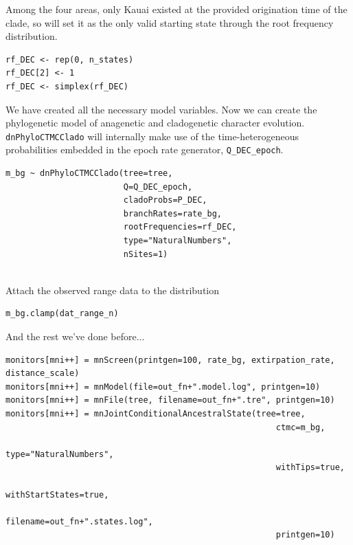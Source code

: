 Among the four areas, only Kauai existed at the provided origination time of the clade, so will set it as the only valid starting state through the root frequency distribution.

\begin{snugshade}
\begin{lstlisting}
rf_DEC <- rep(0, n_states)
rf_DEC[2] <- 1 
rf_DEC <- simplex(rf_DEC)
\end{lstlisting}
\end{snugshade}

We have created all the necessary model variables.
Now we can create the phylogenetic model of anagenetic and cladogenetic character evolution.
{\tt dnPhyloCTMCClado} will internally make use of the time-heterogeneous probabilities embedded in the epoch rate generator, {\tt Q\_DEC\_epoch}.
\begin{snugshade}
\begin{lstlisting}
m_bg ~ dnPhyloCTMCClado(tree=tree,
                        Q=Q_DEC_epoch,
                        cladoProbs=P_DEC,
                        branchRates=rate_bg,
                        rootFrequencies=rf_DEC,
                        type="NaturalNumbers",
                        nSites=1)
                  
\end{lstlisting}
\end{snugshade}

Attach the observed range data to the distribution

\begin{snugshade}
\begin{lstlisting}
m_bg.clamp(dat_range_n)
\end{lstlisting}
\end{snugshade}

And the rest we've done before...

\begin{snugshade}
\begin{lstlisting}
monitors[mni++] = mnScreen(printgen=100, rate_bg, extirpation_rate, distance_scale)
monitors[mni++] = mnModel(file=out_fn+".model.log", printgen=10)
monitors[mni++] = mnFile(tree, filename=out_fn+".tre", printgen=10)
monitors[mni++] = mnJointConditionalAncestralState(tree=tree,
                                                       ctmc=m_bg,
                                                       type="NaturalNumbers",
                                                       withTips=true,
                                                       withStartStates=true,
                                                       filename=out_fn+".states.log",
                                                       printgen=10)
                                                       
\end{lstlisting}
\end{snugshade}

